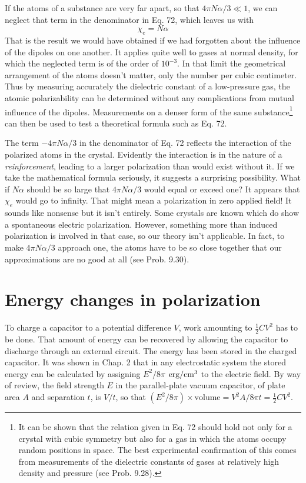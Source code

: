 If the atoms of a substance are very far apart, so that $4\pi N\alpha/3\ll 1$,
we can neglect that term in the denominator in Eq. 72, which leaves
us with
\begin{equation}
  \chi_e = N\alpha
\end{equation}
That is the result we would have obtained if we had forgotten about
the influence of the dipoles on one another. It applies quite well to
gases at normal density, for which the neglected term is of the order
of $10^{-3}$. In that limit the geometrical arrangement of the atoms
doesn't matter, only the number per cubic centimeter. Thus by
measuring accurately the dielectric constant of a low-pressure gas,
the atomic polarizability can be determined without any complications
from mutual influence of the dipoles. Measurements on a
denser form of the same substance\footnote{
It can be shown that the relation given in Eq. 72 should hold not only for a crystal
with cubic symmetry but also for a gas in which the atoms occupy random positions in
space. The best experimental confirmation of this comes from measurements of the
dielectric constants of gases at relatively high density and pressure 
(see Prob. 9.28).} can then be used to test a theoretical formula such as Eq. 72.


The term  $-4\pi N\alpha/3$ in the denominator of Eq. 72 reflects the interaction
of the polarized atoms in the crystal. Evidently the interaction
is in the nature of a \emph{reinforcement}, leading to a larger polarization
than would exist without it. If we take the mathematical formula
seriously, it suggests a surprising possibility. What if $N\alpha$ should be
so large that $4\pi N\alpha/3$ would equal or exceed one? It appears that
$\chi_e$ would go to infinity. That might mean a polarization in zero
applied field! It sounds like nonsense but it isn't entirely. Some
crystals are known which do show a spontaneous electric 
polarization. However, something more than induced polarization is involved
in that case, so our theory isn't applicable. In fact, to make
$4\pi N\alpha/3$ approach one, the atoms have to be so close together that
our approximations are no good at all (see Prob. 9.30).

\section{Energy changes in polarization}

To charge a capacitor to a potential difference $V$, work amounting
to $\frac{1}{2}CV^2$ has to be done. That amount of energy can be recovered
by allowing the capacitor to discharge through an external circuit.
The energy has been stored in the charged capacitor. It was shown
in Chap. 2 that in any electrostatic system the stored energy can be
calculated by assigning $E^2/8\pi$ $\textup{erg}/\textup{cm}^3$ to the electric field. By way
of review, the field strength $E$ in the parallel-plate vacuum capacitor,
of plate area $A$ and separation $t$, is $V/ t$, so that 
$(E^2/8\pi) \times \text{volume} = V^2A/8\pi t = \frac{1}{2}CV^2$.

